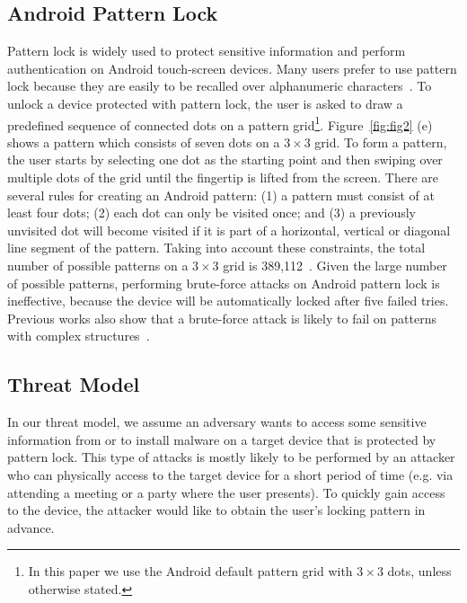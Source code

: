     \subsection{Android Pattern Lock}
    \label{section: android_pattern_lock}
        Pattern lock is widely used to protect sensitive information and perform authentication on
        Android touch-screen devices. Many users prefer to use pattern lock because they
        are easily to be recalled over alphanumeric characters~\cite{standing1970perception,Weiss2008PassShapes}.
        To unlock a device protected with pattern lock, the user is asked to draw a predefined sequence of connected dots on a pattern grid\footnote{In this paper we use the Android default pattern grid with $3 \times 3$ dots, unless otherwise stated.}.
        Figure~\ref{fig:fig2} (e) shows a pattern which consists of seven dots on a $3 \times 3$ grid.
        To form a
        pattern, the user starts by selecting one dot as the
        starting point and then swiping over multiple dots of the grid until the fingertip is lifted from the screen.
        There are several rules for creating an Android pattern: (1) a pattern must consist
        of at least four dots; (2) each dot can only be visited once; and (3) a previously unvisited dot will
        become visited if it is part of a horizontal, vertical or diagonal
        line segment of the pattern. Taking into account these constraints, the total number of possible patterns
        on a $3\times3$ grid is 389,112~\cite{uellenbeck2013quantifying}.
        Given the large number of possible patterns, performing brute-force attacks on
        Android pattern lock is ineffective, because the device will be
        automatically locked after five failed tries.
        Previous works also show that a brute-force attack is likely to fail on  patterns with complex
        structures~\cite{Kelley2012Guess,Mazurek2013Measuring}.
    
    \vspace{-5mm}
    \subsection{Threat Model}
    \label{sec:scenarios}
        In our threat model, we assume an adversary wants to access some sensitive information from or to install malware on a
target device that is protected by pattern lock. This type of attacks is mostly likely to be performed by an attacker
who can physically access to the target device for a short period of time (e.g. via  attending a meeting or a party where
the user presents). To quickly gain access to the device, the attacker would like to obtain
the user's locking pattern in advance.

